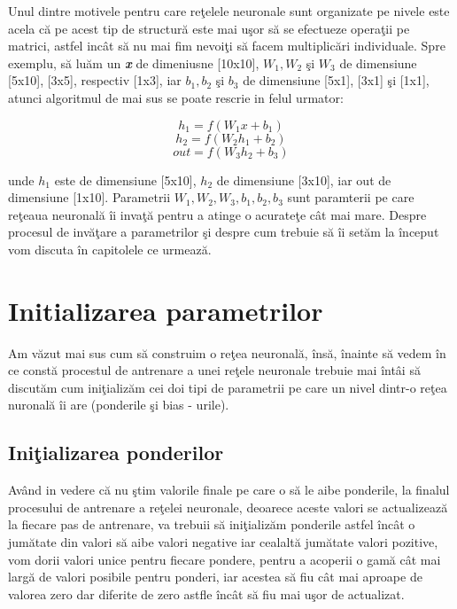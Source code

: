 Unul dintre motivele pentru care re\c{t}elele neuronale sunt organizate pe nivele este acela c\u{a} pe acest tip de structur\u{a} este mai u\c{s}or s\u{a} se efectueze opera\c{t}ii pe matrici, astfel inc\^{a}t s\u{a} nu mai fim nevoi\c{t}i s\u{a} facem multiplic\u{a}ri individuale. Spre exemplu, s\u{a} lu\u{a}m un \textbf{\textit{x}} de dimeniusne [10x10], $W_1, W_2 $ \c{s}i $W_3$ de dimensiune [5x10], [3x5], respectiv [1x3], iar $b_1, b_2 $ \c{s}i $b_3$ de dimensiune [5x1], [3x1] \c{s}i [1x1], atunci algoritmul de mai sus se poate rescrie in felul urmator: 

$$h_1 = f( W_1 x + b_1 ) $$
$$h_2 = f( W_2 h_1 + b_2 ) $$
$$out = f( W_3 h_2 + b_3 ) $$

unde $h_1$ este de dimensiune [5x10], $h_2$ de dimensiune [3x10], iar out de dimensiune [1x10]. Parametrii $W_1, W_2, W_3, b_1, b_2, b_3$ sunt paramterii pe care re\c{t}eaua neuronal\u{a} \^{i}i inva\c{t}\u{a} pentru a atinge o acurate\c{t}e c\^{a}t mai mare. Despre procesul de inv\u{a}\c{t}are a parametrilor \c{s}i despre cum trebuie s\u{a} \^{i}i set\u{a}m la \^{i}nceput vom discuta \^{i}n capitolele ce urmeaz\u{a}.

\section{Initializarea parametrilor}

Am v\u{a}zut mai sus cum s\u{a} construim o re\c{t}ea neuronal\u{a}, \^{i}ns\u{a}, \^{i}nainte s\u{a} vedem \^{i}n ce const\u{a} procestul de antrenare  a unei re\c{t}ele neuronale trebuie mai \^{i}nt\^{a}i s\u{a} discut\u{a}m cum ini\c{t}ializ\u{a}m cei doi tipi de parametrii pe care un nivel dintr-o re\c{t}ea nuronal\u{a} \^{i}i are (ponderile \c{s}i bias - urile). 

\subsection{Ini\c{t}ializarea ponderilor}

Av\^{a}nd in vedere c\u{a} nu \c{s}tim valorile finale pe care o s\u{a} le aibe ponderile, la finalul procesului de antrenare a re\c{t}elei neuronale, deoarece aceste valori se actualizeaz\u{a} la fiecare pas de antrenare, va trebuii s\u{a} ini\c{t}ializ\u{a}m ponderile astfel \^{i}nc\^{a}t o jum\u{a}tate din valori s\u{a} aibe valori negative iar cealalt\u{a} jum\u{a}tate valori pozitive, vom dorii valori unice pentru fiecare pondere, pentru a acoperii o gam\u{a} c\^{a}t mai larg\u{a} de valori posibile pentru ponderi, iar acestea s\u{a} fiu c\^{a}t mai aproape de valorea zero dar diferite de zero astfle \^{i}nc\^{a}t s\u{a} fiu mai u\c{s}or de actualizat.

